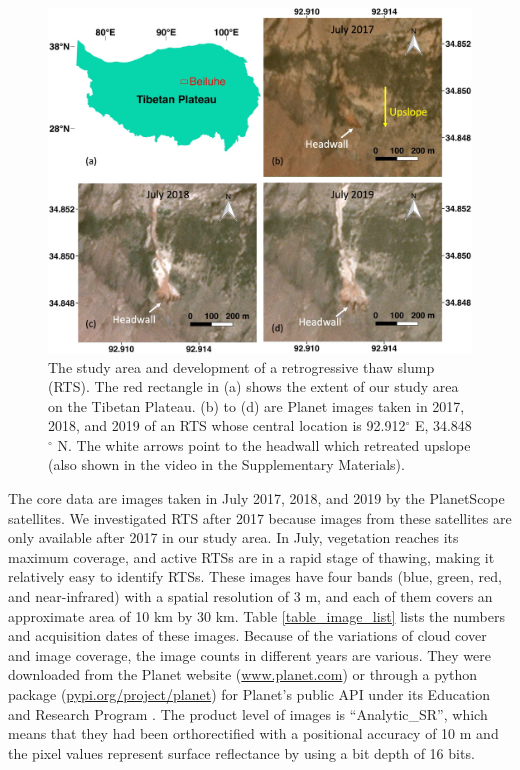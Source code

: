 \documentclass[authoryear,preprint,review,12pt]{elsarticle}
\begin{document}
\begin{figure} 
	\centering
	\includegraphics[width=14cm]{figs/rts_multi_images_study_area_v4_trim.jpg}
	\caption{The study area and development of a retrogressive thaw slump (RTS). The red 
	rectangle in (a) shows the extent of our study area
	on the Tibetan Plateau. (b) to (d) are Planet images taken in 2017, 2018, and 2019 of an RTS whose central location is 92.912$^\circ$ E, 34.848$^\circ$ N. The white arrows point to the headwall which retreated upslope (also shown in the video in the Supplementary Materials).} %
	\label{fig_multi_rts_image_studyarea}
\end{figure}


The core data are images taken in July 2017, 2018, and 2019 by the PlanetScope satellites. We investigated RTS after 2017 because images from these satellites are only available after 2017 in our study area.  
In July, vegetation reaches its maximum coverage, and active RTSs are in a rapid stage of thawing, making it relatively easy to identify RTSs.
These images have four bands (blue, green, red, and near-infrared) with a spatial resolution of 3 m, and each of them covers an approximate area of 10 km by 30 km.
Table \ref{table_image_list} lists the numbers and acquisition dates of these images. 
Because of the variations of cloud cover and image coverage, the image counts in different years are various.
They were downloaded from the Planet website (\url{www.planet.com}) or through a python package (\url{pypi.org/project/planet}) for Planet's public API under its Education and Research Program \citep{team2018planet}. 
The product level of images is ``Analytic\_SR'', which means that they had been orthorectified with a positional accuracy of 10 m and the pixel values represent surface reflectance by using a bit depth of 16 bits. 
\end{document}
